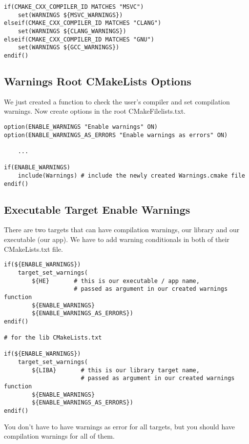 \begin{verbatim}
if(CMAKE_CXX_COMPILER_ID MATCHES "MSVC")
    set(WARNINGS ${MSVC_WARNINGS})
elseif(CMAKE_CXX_COMPILER_ID MATCHES "CLANG")
    set(WARNINGS ${CLANG_WARNINGS})
elseif(CMAKE_CXX_COMPILER_ID MATCHES "GNU")
    set(WARNINGS ${GCC_WARNINGS})
endif()
\end{verbatim}


\subsection{Warnings Root CMakeLists Options}

We just created a function to check the user's compiler and set compilation warnings.
Now create options in the root CMakeFilelists.txt.

\begin{verbatim}
option(ENABLE_WARNINGS "Enable warnings" ON)
option(ENABLE_WARNINGS_AS_ERRORS "Enable warnings as errors" ON)

    ...

if(ENABLE_WARNINGS)
    include(Warnings) # include the newly created Warnings.cmake file
endif()
\end{verbatim}


\subsection{Executable Target Enable Warnings}

There are two targets that can have compilation warnings, our library and our executable (our app). We have to 
add warning conditionals in both of their CMakeLists.txt file.

\begin{verbatim}
if(${ENABLE_WARNINGS})
    target_set_warnings(
        ${HE}       # this is our executable / app name,
                    # passed as argument in our created warnings function
        ${ENABLE_WARNINGS}
        ${ENABLE_WARNINGS_AS_ERRORS})
endif()

# for the lib CMakeLists.txt

if(${ENABLE_WARNINGS})
    target_set_warnings(
        ${LIBA}       # this is our library target name,
                      # passed as argument in our created warnings function
        ${ENABLE_WARNINGS}
        ${ENABLE_WARNINGS_AS_ERRORS})
endif()
\end{verbatim}

You don't have to have warnings as error for all targets, but you should have compilation warnings for all of them.

